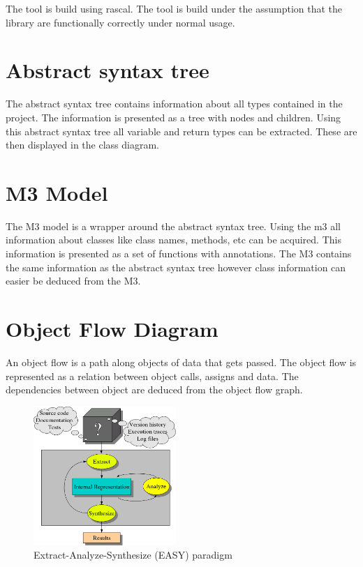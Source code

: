 The tool is build using rascal. The tool is build under the assumption that the library are functionally correctly under normal usage.

\section*{Abstract syntax tree}
The abstract syntax tree contains information about all types contained in the project. The information is presented as a tree with nodes and children. Using this abstract syntax tree all variable and return types can be extracted. These are then displayed in the class diagram.

\section*{M3 Model}
The M3 model is a wrapper around the abstract syntax tree. Using the m3 all information about classes like class names, methods, etc can be acquired. This information is presented as a set of functions with annotations. The M3 contains the same information as the abstract syntax tree however class information can easier be deduced from the M3.

\section*{Object Flow Diagram}
An object flow is a path along objects of data that gets passed. The object flow is represented as a relation between object calls, assigns and data. The dependencies between object are deduced from the object flow graph.

\begin{figure}[h!]
  \begin{center}
    \includegraphics[width=0.48\textwidth]{figures/easy-workflow.png}
  \end{center}
  \caption{Extract-Analyze-Synthesize (EASY) paradigm}
\end{figure}


